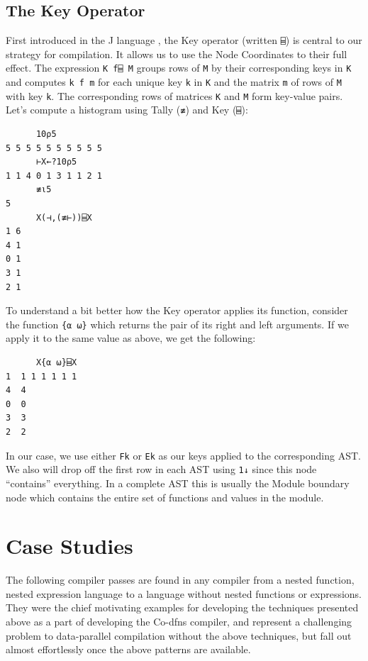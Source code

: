 ﻿\documentclass[numbers,10pt,preprint]{sigplanconf}
\begin{document}
\subsection{The Key Operator}

First introduced in the J language \cite{hui2014key}, the Key operator (written \verb;⌸;) is central to our strategy for compilation. It allows us to use the Node Coordinates to their full effect. The expression \verb;K f⌸ M; groups rows of \verb;M; by their corresponding keys in \verb;K; and computes \verb;k f m; for each unique key \verb;k; in \verb;K; and the matrix \verb;m; of rows of \verb;M; with key \verb;k;. The corresponding rows of matrices \verb;K; and \verb;M; form key-value pairs. Let's compute a histogram using Tally (\verb;≢;) and Key (\verb;⌸;):

\begin{verbatim}
      10⍴5
5 5 5 5 5 5 5 5 5 5
      ⊢X←?10⍴5
1 1 4 0 1 3 1 1 2 1
      ≢⍳5
5
      X(⊣,(≢⊢))⌸X
1 6
4 1
0 1
3 1
2 1
\end{verbatim}

\noindent To understand a bit better how the Key operator applies its function, consider the function \verb;{⍺ ⍵}; which returns the pair of its right and left arguments. If we apply it to the same value as above, we get the following:

\begin{verbatim}
      X{⍺ ⍵}⌸X
1  1 1 1 1 1 1 
4  4           
0  0           
3  3           
2  2
\end{verbatim}

\noindent In our case, we use either \verb;Fk; or \verb;Ek; as our keys applied to the corresponding AST. We also will drop off the first row in each AST using \verb;1↓; since this node ``contains'' everything. In a complete AST this is usually the Module boundary node which contains the entire set of functions and values in the module.

\section{Case Studies}

The following compiler passes are found in any compiler from a nested function, nested expression language to a language without nested functions or expressions. They were the chief motivating examples for developing the techniques presented above as a part of developing the Co-dfns compiler, and represent a challenging problem to data-parallel compilation without the above techniques, but fall out almost effortlessly once the above patterns are available.
\end{document}
